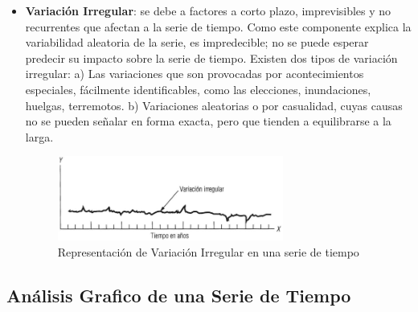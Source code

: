 \begin{itemize}
  \item{\textbf{Variación Irregular}}: se debe a factores a corto plazo, imprevisibles y no recurrentes que afectan a la serie de tiempo. Como este componente
  explica la variabilidad aleatoria de la serie, es impredecible; no se puede esperar predecir su impacto sobre la serie de tiempo. Existen dos tipos 
  de variación irregular: a) Las variaciones que son provocadas por acontecimientos especiales, fácilmente identificables, como las elecciones, inundaciones,
  huelgas, terremotos. b) Variaciones aleatorias o por casualidad, cuyas causas no se pueden señalar en forma exacta, pero que tienden a equilibrarse a la larga.
  \begin{figure}[htb]
    \centering 
    \includegraphics[width=0.7\textwidth]{pictures/tsc4.png}
    \caption{Representación de Variación Irregular en una serie de tiempo}
    \label{fig:tsc4}
  \end{figure}

\end{itemize}


\subsection{Análisis Grafico de una Serie de Tiempo}


